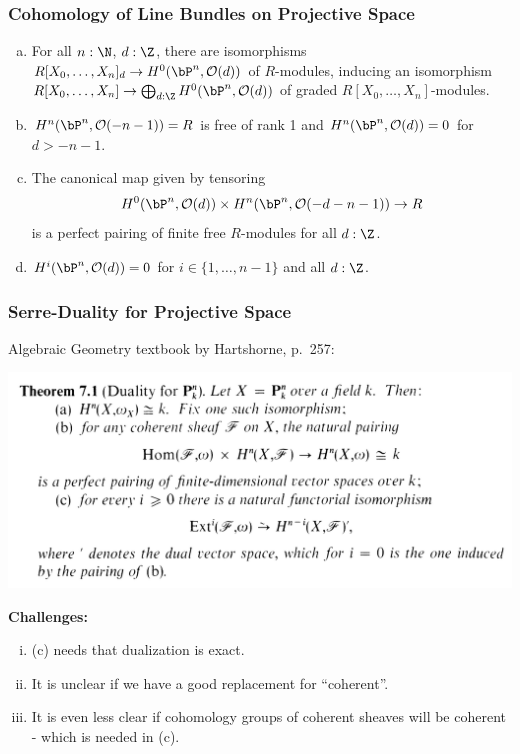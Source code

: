 \documentclass{beamer}
\begin{document}
\begin{frame}
  \frametitle{Cohomology of Line Bundles on Projective Space}
\begin{theorem}
  \label{calculate-cohomology-twisting-sheaves}
  \begin{enumerate}[(a)]
  \item \label{calculate-cohomology-twisting-sheaves-a}
  For all $n:\N$, $d:\Z$, there are isomorphisms $R[X_0,\dots,X_n]_d\to H^0(\bP^n,\mathcal O(d))$ of $R$-modules, inducing an isomorphism $R[X_0,\dots,X_n]\to \bigoplus_{d:\Z} H^0(\bP^n,\mathcal O(d))$ of graded $R[X_0,\dots,X_n]$-modules.
  \item \label{calculate-cohomology-twisting-sheaves-b}
        $H^n(\bP^n,\mathcal O(-n-1))=R$ is free of rank 1 and $H^n(\bP^n,\mathcal O(d))=0$ for $d>-n-1$.
  \item \label{calculate-cohomology-twisting-sheaves-c}
    The canonical map given by tensoring
    \[
      H^0(\bP^n,\mathcal O(d)) \times H^n(\bP^n,\mathcal O(-d-n-1))\to R
    \]
    is a perfect pairing of finite free $R$-modules for all $d:\Z$.
  \item $H^i(\bP^n,\mathcal O(d))=0$ for $i\in\{1,\dots,n-1\}$ and all $d:\Z$.
  \end{enumerate}
\end{theorem}
\end{frame}

\begin{frame}
  \frametitle{Serre-Duality for Projective Space}
  Algebraic Geometry textbook by Hartshorne, p.\ 257: 
  \begin{center}
  \includegraphics[keepaspectratio,
                                 width=0.8\paperwidth,
                                 height=\paperheight]{hartshorne1.png}    
  \end{center}
  \pause
  \textbf{Challenges:}
  \begin{enumerate}[(i)]
  \item (c) needs that dualization is exact.
  \item It is unclear if we have a good replacement for ``coherent''.
  \item It is even less clear if cohomology groups of coherent sheaves will be coherent - which is needed in (c).
  \end{enumerate}
\end{frame}
\end{document}
